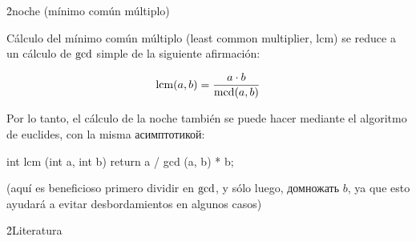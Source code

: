 \h2{noche (mínimo común múltiplo)}

Cálculo del mínimo común múltiplo (least common multiplier, lcm) se reduce a un cálculo de $\rm gcd$ simple de la siguiente afirmación:

$$ {\rm lcm}(a,b) = \frac{ a \cdot b }{ {\rm mcd}(a,b) } $$

Por lo tanto, el cálculo de la noche también se puede hacer mediante el algoritmo de euclides, con la misma асимптотикой:

\code
int lcm (int a, int b) {
return a / gcd (a, b) * b;
}
\endcode

(aquí es beneficioso primero dividir en $\rm gcd$, y sólo luego, домножать $b$, ya que esto ayudará a evitar desbordamientos en algunos casos)


\h2{Literatura}

\ul{
\li {}
}